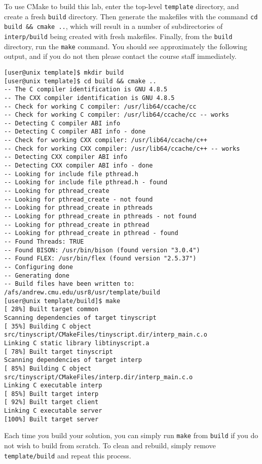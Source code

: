 \documentclass[11pt]{article}
\begin{document}
To use CMake to build this lab, enter the top-level \verb'template' directory, and create a fresh \verb'build' directory. Then generate the makefiles with the command \verb'cd build && cmake ..', which will result in a number of subdirectories of \verb'interp/build' being created with fresh makefiles. Finally, from the \verb'build' directory, run the \verb'make' command. You should see approximately the following output, and if you do not then please contact the course staff immediately.

\begin{lstlisting}[basicstyle=\footnotesize\ttfamily,backgroundcolor=\color{gray!15}]
[user@unix template]$ mkdir build
[user@unix template]$ cd build && cmake ..
-- The C compiler identification is GNU 4.8.5
-- The CXX compiler identification is GNU 4.8.5
-- Check for working C compiler: /usr/lib64/ccache/cc
-- Check for working C compiler: /usr/lib64/ccache/cc -- works
-- Detecting C compiler ABI info
-- Detecting C compiler ABI info - done
-- Check for working CXX compiler: /usr/lib64/ccache/c++
-- Check for working CXX compiler: /usr/lib64/ccache/c++ -- works
-- Detecting CXX compiler ABI info
-- Detecting CXX compiler ABI info - done
-- Looking for include file pthread.h
-- Looking for include file pthread.h - found
-- Looking for pthread_create
-- Looking for pthread_create - not found
-- Looking for pthread_create in pthreads
-- Looking for pthread_create in pthreads - not found
-- Looking for pthread_create in pthread
-- Looking for pthread_create in pthread - found
-- Found Threads: TRUE
-- Found BISON: /usr/bin/bison (found version "3.0.4")
-- Found FLEX: /usr/bin/flex (found version "2.5.37")
-- Configuring done
-- Generating done
-- Build files have been written to: /afs/andrew.cmu.edu/usr8/usr/template/build
[user@unix template/build]$ make
[ 28%] Built target common
Scanning dependencies of target tinyscript
[ 35%] Building C object src/tinyscript/CMakeFiles/tinyscript.dir/interp_main.c.o
Linking C static library libtinyscript.a
[ 78%] Built target tinyscript
Scanning dependencies of target interp
[ 85%] Building C object src/tinyscript/CMakeFiles/interp.dir/interp_main.c.o
Linking C executable interp
[ 85%] Built target interp
[ 92%] Built target client
Linking C executable server
[100%] Built target server
\end{lstlisting}

Each time you build your solution, you can simply run \verb'make' from \verb'build' if you do not wish to build from scratch. To clean and rebuild, simply remove \verb'template/build' and repeat this process.
\end{document}

